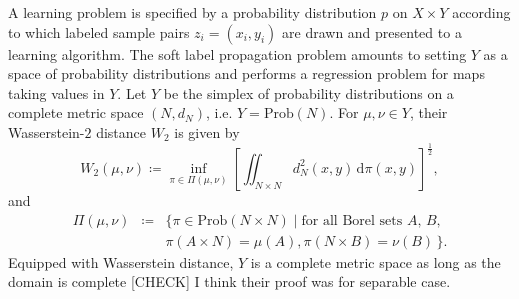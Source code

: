 \documentclass[letterpaper]{article} %
\begin{document}
A learning problem is specified by a probability distribution $p$ on $X\times Y$ according to which labeled sample pairs $z_i=\left( x_i,y_i \right)$ are drawn and presented to a learning algorithm. The soft label propagation problem amounts to setting $Y$ as a space of probability distributions and performs a regression problem for maps taking values in $Y$. Let 
$Y$ be the simplex of probability distributions on a complete metric space $\left( N,d_N \right)$, i.e. $Y=\mathrm{Prob}\left( N \right)$. For $\mu, \nu\in Y$, their Wasserstein-$2$ distance $W_2$ is given by 
\begin{equation}
  \label{eq:wasserstein-distance}
  W_2 \left( \mu,\nu \right)\coloneqq\inf_{\pi\in\Pi \left( \mu,\nu \right)}\left[\iint_{N\times N}d^2_N \left( x,y \right)\,\mathrm{d}\pi \left( x,y \right)\right]^{\frac{1}{2}},
\end{equation}
and
\begin{eqnarray}
  \Pi \left( \mu,\nu \right)&\coloneqq &\big\{ \pi\in \mathrm{Prob}\left( N\times N \right) \mid \textrm{for all Borel sets $A$, $B$}, \nonumber\\
  &&\pi \left( A\times N \right)=\mu \left( A \right),\pi \left( N\times B \right)=\nu \left( B \right)\,\big\}. \label{eq:coupling}
\end{eqnarray}
Equipped with Wasserstein distance, $Y$ is a complete metric space as long as the domain is complete \cite[Theorem 6.18]{villani2003topics} {\color{blue}[CHECK] I think their proof was for separable case}. 
\end{document}
